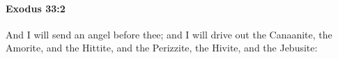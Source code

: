 
		\paragraph{Exodus 33:2} %
			\label{EXODUS-33-2}

			And I will send an angel before thee; and I will drive out the Canaanite, the Amorite, and the Hittite, and the Perizzite, the Hivite, and the Jebusite:



